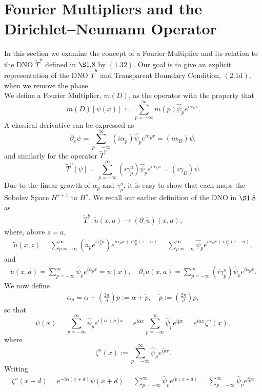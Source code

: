 \section{Fourier Multipliers and the Dirichlet--Neumann Operator}
\label{intro:dno}
In this section we examine the concept of a Fourier Multiplier and its relation to the DNO $\tilde{T}^u$ defined in $\S 1.8$ by $(1.32)$. Our goal is to give an explicit representation of the DNO $\tilde{T}^u$ and Transparent Boundary Condition, $(2.1\text{d})$, when we remove the phase.
\newline
\\
We define a Fourier Multiplier, $m(D)$, as the operator with the property that
$$m(D)\left[\psi(x)\right]:=\sum_{p=-\infty}^{\infty}m(p)\hat{\psi}_p e^{i\alpha_p x}.$$
A classical derivative can be expressed as
$$\partial_x \psi = \sum_{p=-\infty}^{\infty} (i\alpha_p)\hat{\psi}_p e^{i\alpha_p x} = (i\alpha_D)\psi,$$
and similarly for the operator $\tilde{T}^u$
$$\tilde{T}^u\left[\psi\right] = \sum_{p=-\infty}^{\infty} (i\gamma_p^u)\hat{\psi}_p e^{i\alpha_p x} = (i\gamma_D)\psi.$$
Due to the linear growth of $\alpha_p$ and $\gamma_p^u$, it is easy to show that each maps the Sobolev Space $H^{s+1}$ to $H^s$. We recall our earlier definition of the DNO in $\S 1.8$ as
\begin{align}
\tilde{T}^u:\tilde{u}(x,a) \to \left(\partial_z \tilde{u}\right)(x,a),
\end{align}
where, above $z=a$,
\begin{align}
\tilde{u}(x,z)=\sum_{p=-\infty}^{\infty}\left(a_pe^{i\gamma_p^ua}\right)e^{i\alpha_px + i\gamma_p^u (z-a)}=\sum_{p=-\infty}^{\infty}\hat{\psi}_pe^{i\alpha_px + i\gamma_p^u (z-a)},
\end{align}
and
\begin{align}
\tilde{u}(x,a)= \sum_{p=-\infty}^{\infty}\hat{\psi}_pe^{i\alpha_px}=\psi(x),\quad \partial_z \tilde{u}(x,a)=\sum_{p=-\infty}^{\infty}(i\gamma_p^u)\hat{\psi}_pe^{i\alpha_px}.
\end{align}
We now define
\begin{align}
\alpha_p=\alpha + \left(\frac{2\pi}{d}\right)p :=\alpha+\tilde{p},\quad \tilde{p}:=\left(\frac{2\pi}{d}\right)p,
\end{align}
so that
$$
\psi(x)=\sum_{p=-\infty}^{\infty}\hat{\psi}_pe^{i(\alpha + \tilde{p})x}=
e^{i\alpha x}\sum_{p=-\infty}^{\infty}\hat{\psi}_pe^{i\tilde{p} x}=e^{i\alpha x}\zeta^u(x),$$
where
$$\zeta^u(x):= \sum_{p=-\infty}^{\infty}\hat{\psi}_pe^{i\tilde{p} x}.$$
Writing
\begin{align*}
\zeta^u(x+d)=e^{-i\alpha(x+d)}\psi(x+d)=\sum_{p=-\infty}^{\infty}\hat{\psi}_pe^{i\tilde{p} (x+d)}=
\sum_{p=-\infty}^{\infty}\hat{\psi}_pe^{i\tilde{p} x}
\end{align*}

